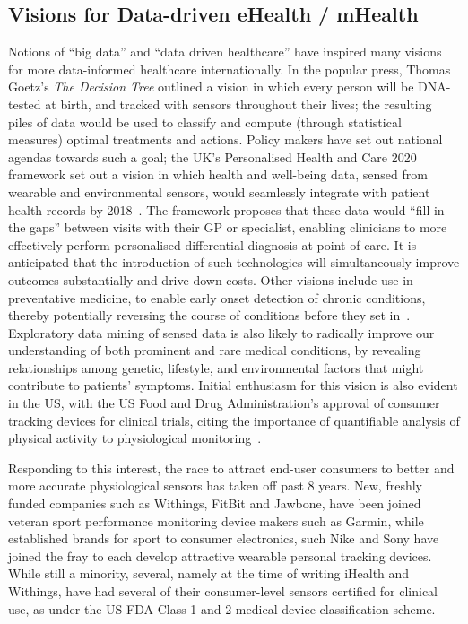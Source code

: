 \documentclass{sigchi}
\begin{document}
\subsection{Visions for Data-driven eHealth / mHealth}
Notions of ``big data'' and ``data driven healthcare'' have inspired many visions  for more data-informed healthcare internationally. In the popular press, Thomas Goetz's \emph{The Decision Tree} outlined a vision in which every person will be DNA-tested at birth, and tracked with sensors throughout their lives; the resulting piles of data would be used to classify and compute (through statistical measures) optimal treatments and actions. Policy makers have set out national agendas towards such a goal; the UK's Personalised Health and Care 2020 framework set out a vision in which health and well-being data, sensed from wearable and environmental sensors, would seamlessly integrate with patient health records by 2018~\cite{Personalised2014}.  The framework proposes that these data would ``fill in the gaps'' between visits with their GP or specialist, enabling clinicians to more effectively perform personalised differential diagnosis at point of care.  It is anticipated that the introduction of such technologies will simultaneously improve outcomes substantially and drive down costs.  Other visions include use in preventative medicine, to enable early onset detection of chronic conditions, thereby potentially reversing the course of conditions before they set in~\cite{Swan2009}.  Exploratory data mining of sensed data is also likely to radically improve our understanding of both prominent and rare medical conditions, by revealing relationships among genetic, lifestyle, and environmental factors that might contribute to patients' symptoms.  Initial enthusiasm for this vision is also evident in the US, with the US Food and Drug Administration's approval of  consumer tracking devices for clinical trials, citing the importance of quantifiable analysis of physical activity to physiological monitoring~\cite{U.S.FoodandDrugAdministration2014}.


Responding to this interest, the race to attract end-user consumers to better and more accurate physiological sensors has taken off past 8 years. New, freshly funded companies such as Withings, FitBit and Jawbone, have been joined veteran sport performance monitoring device makers such as Garmin, while established brands for sport to consumer electronics, such Nike and Sony have joined the fray to each develop attractive wearable personal tracking devices.  While still a minority, several, namely at the time of writing iHealth and Withings, have had several of their consumer-level sensors certified for clinical use, as under the US FDA Class-1 and 2 medical device classification scheme. 
\end{document}
